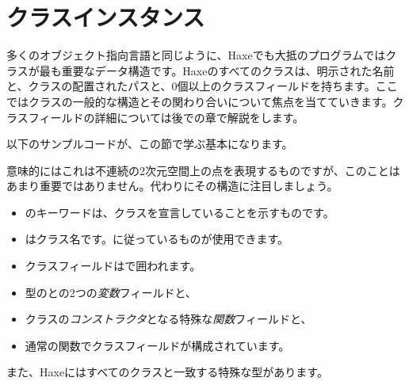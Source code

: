 
\section{クラスインスタンス}
\label{types-class-instance}


多くのオブジェクト指向言語と同じように、Haxeでも大抵のプログラムではクラスが最も重要なデータ構造です。Haxeのすべてのクラスは、明示された名前と、クラスの配置されたパスと、0個以上のクラスフィールドを持ちます。ここではクラスの一般的な構造とその関わり合いについて焦点を当てていきます。クラスフィールドの詳細については後での章で解説をします。

以下のサンプルコードが、この節で学ぶ基本になります。


意味的にはこれは不連続の2次元空間上の点を表現するものですが、このことはあまり重要ではありません。代わりにその構造に注目しましょう。

\begin{itemize}
	\item {}のキーワードは、クラスを宣言していることを示すものです。
	\item {}はクラス名です。に従っているものが使用できます。
	\item クラスフィールドは\expr{$\left\{\right\}$}で囲われます。
	\item {}型のとの2つの\emph{変数}フィールドと、
	\item クラスの\emph{コンストラクタ}となる特殊な\emph{関数}フィールドと、
	\item 通常の関数でクラスフィールドが構成されています。
\end{itemize}

また、Haxeにはすべてのクラスと一致する特殊な型があります。



